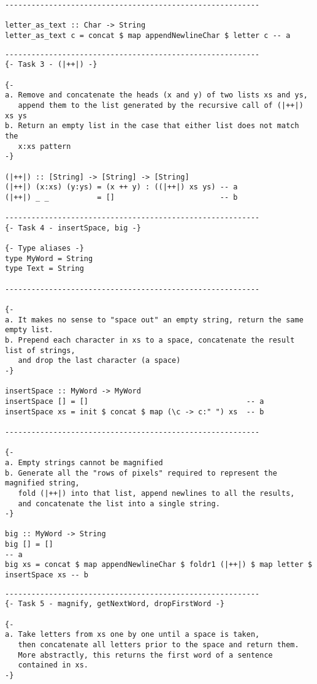 \documentclass[11pt]{article}
\begin{document}
{\begin{verbatim}
----------------------------------------------------------

letter_as_text :: Char -> String
letter_as_text c = concat $ map appendNewlineChar $ letter c -- a
\end{verbatim}
\newpage
\begin{verbatim}
----------------------------------------------------------
{- Task 3 - (|++|) -}

{-
a. Remove and concatenate the heads (x and y) of two lists xs and ys, 
   append them to the list generated by the recursive call of (|++|) xs ys
b. Return an empty list in the case that either list does not match the 
   x:xs pattern
-}

(|++|) :: [String] -> [String] -> [String]
(|++|) (x:xs) (y:ys) = (x ++ y) : ((|++|) xs ys) -- a
(|++|) _ _           = []                        -- b

----------------------------------------------------------
{- Task 4 - insertSpace, big -}

{- Type aliases -}
type MyWord = String
type Text = String

----------------------------------------------------------

{- 
a. It makes no sense to "space out" an empty string, return the same empty list.
b. Prepend each character in xs to a space, concatenate the result list of strings,
   and drop the last character (a space)
-}

insertSpace :: MyWord -> MyWord
insertSpace [] = []                                    -- a
insertSpace xs = init $ concat $ map (\c -> c:" ") xs  -- b

----------------------------------------------------------

{-
a. Empty strings cannot be magnified
b. Generate all the "rows of pixels" required to represent the magnified string,
   fold (|++|) into that list, append newlines to all the results,
   and concatenate the list into a single string.
-}

big :: MyWord -> String
big [] = []                                                                           -- a
big xs = concat $ map appendNewlineChar $ foldr1 (|++|) $ map letter $ insertSpace xs -- b
\end{verbatim}
\newpage
\begin{verbatim}
----------------------------------------------------------
{- Task 5 - magnify, getNextWord, dropFirstWord -}

{-
a. Take letters from xs one by one until a space is taken,
   then concatenate all letters prior to the space and return them.
   More abstractly, this returns the first word of a sentence
   contained in xs.
-}


\end{verbatim}}
\end{document}
